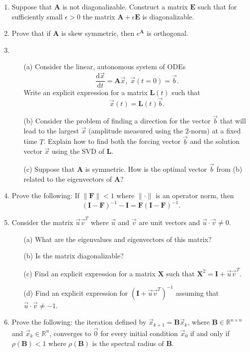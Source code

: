\documentclass[11pt,fleqn]{article}
\newcommand{\mat}[1]{\mathbf{#1}}
\begin{document}
\begin{enumerate}
\item Suppose that $\mathbf{A}$ is not diagonalizable. Construct a matrix $\mathbf{E}$ such that for sufficiently small $\epsilon>0$ the matrix $\mathbf{A} + \epsilon\mathbf{E}$ is diagonalizable.
\item Prove that if $\mat{A}$ is skew symmetric, then $e^{\mat{A}}$ is orthogonal.
\item 
\begin{itemize}
	\item[(a)] Consider the linear, autonomous system of ODEs
\[\frac{\mathrm{d}\vec{x}}{\mathrm{d}t} = \mathbf{A}\vec{x},\;\vec{x}(t=0) = \vec{b}.\] 
	Write an explicit expression for a matrix $\mathbf{L}(t)$ such that
\[\vec{x}(t) = \mathbf{L}(t)\vec{b}.\]
	\item[(b)] Consider the problem of finding a direction for the vector $\vec{b}$ that will lead to the largest $\vec{x}$ (amplitude measured using the 2-norm) at a fixed time $T$. Explain how to find both the forcing vector $\vec{b}$ and the solution vector $\vec{x}$ using the SVD of $\mathbf{L}$.
	\item[(c)] Suppose that $\mathbf{A}$ is symmetric. How is the optimal vector $\vec{b}$ from (b) related to the eigenvectors of $\mathbf{A}$?
\end{itemize}
\item Prove the following: If $\|\mat{F}\|<1$ where $\|\cdot\|$ is an operator norm, then 
\[(\mat{I}-\mat{F})^{-1} - \mat{I} = \mat{F}(\mat{I}-\mat{F})^{-1}.\]
\item Consider the matrix $\vec{u}\vec{v}^T$ where $\vec{u}$ and $\vec{v}$ are unit vectors and $\vec{u}\cdot\vec{v}\neq0$.
	\begin{itemize}
	\item[(a)] What are the eigenvalues and eigenvectors of this matrix?
	\item[(b)] Is the matrix diagonalizable?
	\item[(c)] Find an explicit expression for a matrix $\mathbf{X}$ such that $\mathbf{X}^2 = \mathbf{I} + \vec{u}\vec{v}^T$.
	\item[(d)] Find an explicit expression for $(\mathbf{I} + \vec{u}\vec{v}^T)^{-1}$ assuming that $\vec{u}\cdot\vec{v}\neq -1$.
	\end{itemize}

\item Prove the following: the iteration defined by $\vec{x}_{k+1}=\mat{B}\vec{x}_k$, where $\mat{B}\in\mathbb{R}^{n\times n}$ and $\vec{x}_k\in\mathbb{R}^n$,  converges to $\vec{0}$ for every initial condition $\vec{x}_0$ if and only if $\rho(\mat{B})<1$ where $\rho(\mat{B})$ is the spectral radius of $\mat{B}$.
\end{enumerate}
 
\end{document}
